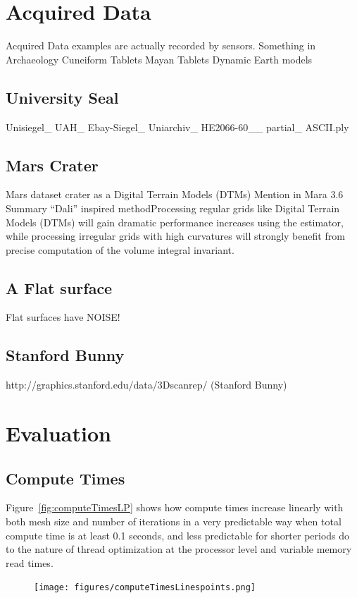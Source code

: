\section{Acquired Data}
Acquired Data examples are actually recorded by sensors.
Something in Archaeology
Cuneiform Tablets
Mayan Tablets
Dynamic Earth models

\subsection{University Seal}
Unisiegel\_\- UAH\_\- Ebay-Siegel\_\- Uniarchiv\_\- HE2066-60\_\_\- partial\_\- ASCII.ply

\subsection{Mars Crater}
Mars dataset crater as a Digital Terrain Models (DTMs) Mention in Mara 3.6 
Summary “Dali” inspired methodProcessing regular grids like Digital Terrain 
Models (DTMs) will gain dramatic performance increases using the estimator, 
while processing irregular grids with high curvatures will strongly benefit 
from precise computation of the volume integral invariant.~\cite[p.~143]{Mara12}

\subsection{A Flat surface}
Flat surfaces have NOISE!

\subsection{Stanford Bunny}
http://graphics.stanford.edu/data/3Dscanrep/ (Stanford Bunny)



\section{Evaluation}
\subsection{Compute Times}

Figure~\ref{fig:computeTimesLP} shows how compute times increase linearly with both mesh size and number of iterations in a very predictable way when total compute time is at least 0.1 seconds, and less predictable for shorter periods do to the nature of thread optimization at the processor level and variable memory read times.
\begin{figure}[ht]
	\centering
	\texttt{[image: figures/computeTimesLinespoints.png]}
\end{figure}

